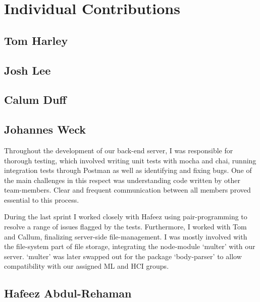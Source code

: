 \section{Individual Contributions}
\subsection{Tom Harley}
\subsection{Josh Lee}
\subsection{Calum Duff}
\subsection{Johannes Weck}
Throughout the development of our back-end server, I was responsible for thorough testing, which involved writing unit tests with mocha and chai, running integration tests through Postman as well as identifying and fixing bugs. One of the main challenges in this respect was understanding code written by other team-members. Clear and frequent communication between all members proved essential to this process.

During the last sprint I worked closely with Hafeez using pair-programming to resolve a range of issues flagged by the tests. Furthermore, I worked with Tom and Callum, finalizing server-side file-management. I was mostly involved with the file-system part of file storage, integrating the node-module `multer' with our server. `multer' was later swapped out for the package `body-parser' to allow compatibility with our assigned ML and HCI groups.
\subsection{Hafeez Abdul-Rehaman}
